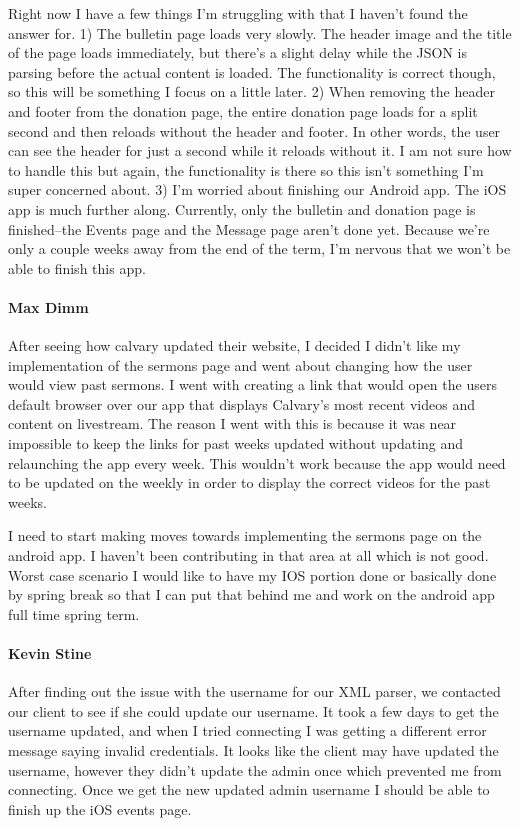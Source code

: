 Right now I have a few things I'm struggling with that I haven't found the answer for. 1) The bulletin page loads very slowly. The header image and the title of the page loads immediately, but there's a slight delay while the JSON is parsing before the actual content is loaded. The functionality is correct though, so this will be something I focus on a little later. 2) When removing the header and footer from the donation page, the entire donation page loads for a split second and then reloads without the header and footer. In other words, the user can see the header for just a second while it reloads without it. I am not sure how to handle this but again, the functionality is there so this isn't something I'm super concerned about. 3) I'm worried about finishing our Android app. The iOS app is much further along. Currently, only the bulletin and donation page is finished--the Events page and the Message page aren't done yet. Because we're only a couple weeks away from the end of the term, I'm nervous that we won't be able to finish this app.

			\paragraph{Max Dimm}
			After seeing how calvary updated their website, I decided I didn't like my implementation of the sermons page and went about changing how the user would view past sermons. I went with creating a link that would open the users default browser over our app that displays Calvary's most recent videos and content on livestream. The reason I went with this is because it was near impossible to keep the links for past weeks updated without updating and relaunching the app every week. This wouldn't work because the app would need to be updated on the weekly in order to display the correct videos for the past weeks.

I need to start making moves towards implementing the sermons page on the android app. I haven't been contributing in that area at all which is not good. Worst case scenario I would like to have my IOS portion done or basically done by spring break so that I can put that behind me and work on the android app full time spring term.
			
			\paragraph{Kevin Stine}
			After finding out the issue with the username for our XML parser, we contacted our client to see if she could update our username. It took a few days to get the username updated, and when I tried connecting I was getting a different error message saying invalid credentials. It looks like the client may have updated the username, however they didn't update the admin once which prevented me from connecting. Once we get the new updated admin username I should be able to finish up the iOS events page.

